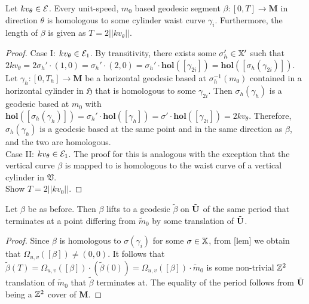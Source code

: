 \documentclass[]{article}
\def\hol{\mathbf{hol}}
\def\bM{\mathbf{M}}
\def\mtild{\tilde{m}_0}
\begin{document}
\begin{thm}
Let $kv_\theta\in\mathcal{E}$. Every unit-speed, $m_0$ based geodesic segment $\beta:[0,T]\rightarrow\bM$ in direction $\theta$ is homologous to some cylinder waist curve $\gamma_i$. Furthermore, the length of $\beta$ is given as $T=2||kv_\theta||$.
\begin{proof}
Case I: $kv_\theta\in\mathcal{E}_1$. By transitivity, there exists some $\sigma_h'\in\mathbb{X}'$ such that $2kv_\theta=2\sigma_h'\cdot(1,0)=\sigma_h'\cdot(2,0)=\sigma_h'\cdot\hol([\gamma_{2i}])=\hol([\sigma_h(\gamma_{2i})])$. Let $\gamma_h:[0,T_h]\rightarrow\bM$ be a horizontal geodesic based at $\sigma_h^{-1}(m_0)$ contained in a horizontal cylinder in $\mathfrak{H}$ that is homologous to some $\gamma_{2i}$. Then $\sigma_h(\gamma_h)$ is a geodesic based at $m_0$ with $\hol([\sigma_h(\gamma_h)])=\sigma_h'\cdot\hol([\gamma_h])=\sigma'\cdot\hol([\gamma_{2i}])=2kv_\theta$. Therefore, $\sigma_h(\gamma_h)$ is a geodesic based at the same point and in the same direction as $\beta$, and the two are homologous.\\
Case II: $kv_\theta\in\mathcal{E}_1$. The proof for this is analogous with the exception that the vertical curve $\beta$ is mapped to is homologous to the waist curve of a vertical cylinder in $\mathfrak{V}$.\\
Show $T=2||kv_0||$.
\end{proof}
\end{thm}

\begin{cor}
Let $\beta$ be as before. Then $\beta$ lifts to a  geodesic $\tilde{\beta}$ on $\tilde{\mathbf{U}}$ of the same period that terminates at a point differing from $\mtild$ by some translation of $\tilde{\mathbf{U}}$.
\begin{proof}
Since $\beta$ is homologous to $\sigma(\gamma_i)$ for some $\sigma\in\mathbb{X}$, from [lem] we obtain that $\Omega_{u,v}([\beta])\neq(0,0)$. It follows that $\tilde{\beta}(T)=\Omega_{u,v}([\beta])\cdot(\tilde{\beta}(0))=\Omega_{u,v}([\beta])\cdot\mtild$ is some non-trivial $\mathbb{Z}^2$ translation of $\mtild$ that $\tilde{\beta}$ terminates at. The equality of the period follows from $\tilde{\mathbf{U}}$ being a $\mathbb{Z}^2$ cover of $\bM$.
\end{proof}
\end{cor}
\end{document}
